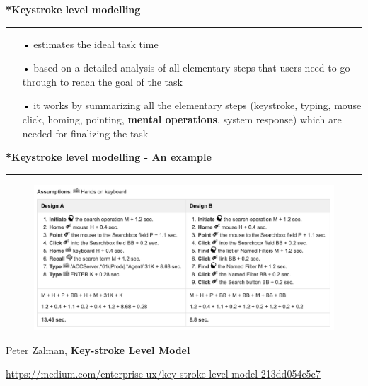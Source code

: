 \documentclass[pdf]{beamer}
\begin{document}
\begin{frame}
\vspace{8mm}
\textcolor{myBlue}{\textbf{\Large{*Keystroke level modelling}}}

\textcolor{red}{\rule{10cm}{1mm}}

  \begin{itemize}
  	\item[\textcolor{black}{•}] estimates the ideal task time
  	\newline
  	
  	\item[\textcolor{black}{•}] based on a detailed analysis of all elementary steps that users need to go through to reach the goal of the task
  	\newline
  	
  	\item[\textcolor{black}{•}] it works by summarizing all the elementary steps (keystroke, typing, mouse click, homing, pointing, \textbf{mental operations}, system response) which are needed for finalizing the task
  \end{itemize}
  
\end{frame}



\begin{frame}
\vspace{8mm}
\textcolor{myBlue}{\textbf{\Large{*Keystroke level modelling - An example}}}

\textcolor{red}{\rule{10cm}{1mm}}

  \begin{figure}
  \centering
  	\includegraphics[scale=0.2]{KLM_example.png} 
  \end{figure}
  
  Peter Zalman, \textbf{Key-stroke Level Model}
  
  \url{https://medium.com/enterprise-ux/key-stroke-level-model-213dd054e5c7}
  
\end{frame}
\end{document}

